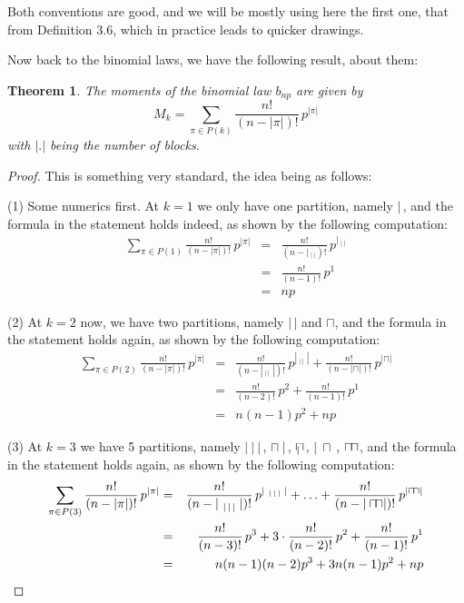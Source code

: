 \documentclass[12pt]{amsbook}
\newtheorem{theorem}{Theorem}[chapter]
\begin{document}
Both conventions are good, and we will be mostly using here the first one, that from Definition 3.6, which in practice leads to quicker drawings.

\bigskip

Now back to the binomial laws, we have the following result, about them:


\begin{theorem}
The moments of the binomial law $b_{np}$ are given by
$$M_k=\sum_{\pi\in P(k)}\frac{n!}{(n-|\pi|)!}\,p^{|\pi|}$$
with $|.|$ being the number of blocks.
\end{theorem}

\begin{proof}
This is something very standard, the idea being as follows:

\medskip

(1) Some numerics first. At $k=1$ we only have one partition, namely $|$\,, and the formula in the statement holds indeed, as shown by the following computation:
\begin{eqnarray*}
\sum_{\pi\in P(1)}\frac{n!}{(n-|\pi|)!}\,p^{|\pi|}
&=&\frac{n!}{(n-|{\ }_|\;|)!}\,p^{|{\ }_|\;|}\\
&=&\frac{n!}{(n-1)!}\,p^1\\
&=&np
\end{eqnarray*}

(2) At $k=2$ now, we have two partitions, namely $|\,|$ and $\sqcap$, and the formula in the statement holds again, as shown by the following computation:
\begin{eqnarray*}
\sum_{\pi\in P(2)}\frac{n!}{(n-|\pi|)!}\,p^{|\pi|}
&=&\frac{n!}{(n-|{\ }_{|\,|}\;|)!}\,p^{|{\ }_{|\,|}\;|}+\frac{n!}{(n-|\sqcap|)!}\,p^{|\sqcap|}\\
&=&\frac{n!}{(n-2)!}\,p^2+\frac{n!}{(n-1)!}\,p^1\\
&=&n(n-1)p^2+np
\end{eqnarray*}

(3) At $k=3$ we have 5 partitions, namely $|\ |\ |$\,, $\sqcap\ |$\,, $\sqcap\hskip-3.2mm{\ }_|$\,\,, $|\ \sqcap$\,, $\sqcap\hskip-0.7mm\sqcap$, and the formula in the statement holds again, as shown by the following computation:
\begin{eqnarray*}
\sum_{\pi\in P(3)}\frac{n!}{(n-|\pi|)!}\,p^{|\pi|}
&=&\frac{n!}{(n-|{\ }_{|\,|\,|}\;|)!}\,p^{|{\ }_{|\,|\,|}\;|}+\ldots+\frac{n!}{(n-|\sqcap\hskip-1.6mm\sqcap|)!}\,p^{|\sqcap\hskip-0.57mm\sqcap|}\\
&=&\frac{n!}{(n-3)!}\,p^3+3\cdot\frac{n!}{(n-2)!}\,p^2+\frac{n!}{(n-1)!}\,p^1\\
&=&n(n-1)(n-2)p^3+3n(n-1)p^2+np
\end{eqnarray*}


\end{proof}
\end{document}
